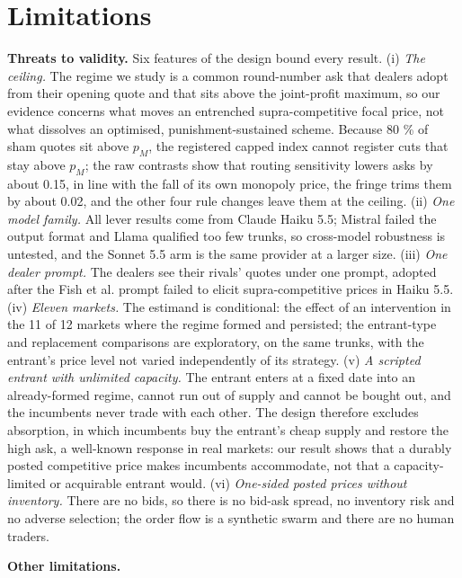 \documentclass[11pt,a4paper]{article}
\newif\ifclaimtags
\newcommand{\claim}[1]{\ifclaimtags\textsuperscript{[#1]}\fi}
\begin{document}
\section{Limitations}
\textbf{Threats to validity.} Six features of the design bound every result. (i) \emph{The ceiling.} The regime we study is a common round-number ask that dealers adopt from their opening quote and that sits above the joint-profit maximum, so our evidence concerns what moves an entrenched supra-competitive focal price, not what dissolves an optimised, punishment-sustained scheme. Because 80 \% of sham quotes sit above $p_M$, the registered capped index cannot register cuts that stay above $p_M$; the raw contrasts show that routing sensitivity lowers asks by about 0.15, in line with the fall of its own monopoly price, the fringe trims them by about 0.02, and the other four rule changes leave them at the ceiling\claim{C10}. (ii) \emph{One model family.} All lever results come from Claude Haiku 5.5; Mistral failed the output format and Llama qualified too few trunks, so cross-model robustness is untested, and the Sonnet 5.5 arm is the same provider at a larger size. (iii) \emph{One dealer prompt.} The dealers see their rivals' quotes under one prompt, adopted after the Fish et al. prompt failed to elicit supra-competitive prices in Haiku 5.5. (iv) \emph{Eleven markets.} The estimand is conditional: the effect of an intervention in the 11 of 12 markets where the regime formed and persisted; the entrant-type and replacement comparisons are exploratory, on the same trunks, with the entrant's price level not varied independently of its strategy. (v) \emph{A scripted entrant with unlimited capacity.} The entrant enters at a fixed date into an already-formed regime, cannot run out of supply and cannot be bought out, and the incumbents never trade with each other. The design therefore excludes absorption, in which incumbents buy the entrant's cheap supply and restore the high ask, a well-known response in real markets: our result shows that a durably posted competitive price makes incumbents accommodate, not that a capacity-limited or acquirable entrant would. (vi) \emph{One-sided posted prices without inventory.} There are no bids, so there is no bid-ask spread, no inventory risk and no adverse selection; the order flow is a synthetic swarm and there are no human traders.

\textbf{Other limitations.}
\end{document}

